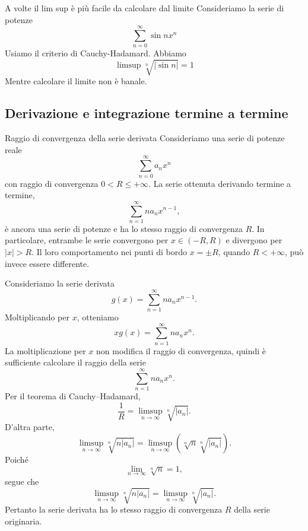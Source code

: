 \documentclass[a4paper]{article}
\begin{document}
\begin{radioactive}
\begin{snippetexample}{A volte il lim sup è più facile da calcolare dal limite}
    Consideriamo la serie di potenze
    \[
        \sum_{n=0}^\infty \sin n x^n
    \]
    Usiamo il criterio di Cauchy-Hadamard. Abbiamo
    \[
        \limsup \sqrt[n]{
            |\sin n|
        } = 1
    \]
    Mentre calcolare il limite non è banale.
\end{snippetexample}
\end{radioactive}

\subsection{Derivazione e integrazione termine a termine}

\begin{radioactive}
\begin{snippetproposition}{Raggio di convergenza della serie derivata}
    Consideriamo una serie di potenze reale
    \[
        \sum_{n=0}^\infty a_n x^n
    \]
    con raggio di convergenza \(0<R\leq+\infty\).
    La serie ottenuta derivando termine a termine,
    \[
        \sum_{n=1}^\infty n a_n x^{n-1},
    \]
    è ancora una serie di potenze e ha lo stesso raggio di convergenza \(R\).
    In particolare, entrambe le serie convergono per \(x\in(-R,R)\)
    e divergono per \(|x|>R\). Il loro comportamento nei punti di bordo
    \(x=\pm R\), quando \(R<+\infty\), può invece essere differente.
\end{snippetproposition}
\end{radioactive}

\begin{radioactive}
\begin{snippetproof}{}
    Consideriamo la serie derivata
    \[
        g(x)
        =
        \sum_{n=1}^\infty n a_n x^{n-1}.
    \]
    Moltiplicando per \(x\), otteniamo
    \[
        xg(x)
        =
        \sum_{n=1}^\infty n a_n x^n.
    \]
    La moltiplicazione per \(x\) non modifica il raggio di convergenza,
    quindi è sufficiente calcolare il raggio della serie
    \[
        \sum_{n=1}^\infty n a_n x^n.
    \]
    Per il teorema di Cauchy--Hadamard,
    \[
        \frac{1}{R}
        =
        \limsup_{n\to\infty}
        \sqrt[n]{|a_n|}.
    \]
    D'altra parte,
    \[
        \limsup_{n\to\infty}
        \sqrt[n]{n|a_n|}
        =
        \limsup_{n\to\infty}
        \left(
            \sqrt[n]{n}\sqrt[n]{|a_n|}
        \right).
    \]
    Poiché
    \[
        \lim_{n\to\infty}\sqrt[n]{n}=1,
    \]
    segue che
    \[
        \limsup_{n\to\infty}
        \sqrt[n]{n|a_n|}
        =
        \limsup_{n\to\infty}
        \sqrt[n]{|a_n|}.
    \]
    Pertanto la serie derivata ha lo stesso raggio di convergenza \(R\)
    della serie originaria.
\end{snippetproof}
\end{radioactive}
\end{document}
